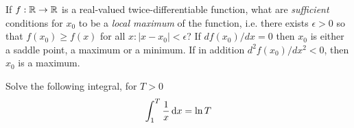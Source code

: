 \documentclass[a4paper]{article}
\def\solution {1}
\begin{document}
\begin{exercise}
  If $f : {\mathbb{R}} \to {\mathbb{R}}$ is a real-valued twice-differentiable function, what are \emph{sufficient} conditions for $x_0$ to be a \emph{local maximum} of the function, i.e. there exists $\epsilon > 0$ so that $f(x_0) \geq f(x)$ for all $x : |x - x_0| < \epsilon$?
  \ifdefined\solution
  If $d f(x_0) /dx  = 0$ then
  $x_0$ is either a saddle point, a maximum or a minimum. If in addition $d^2 f(x_0) /dx^2 < 0$, then $x_0$ is a maximum.
  \fi
\end{exercise}

\begin{exercise}
  Solve the following integral, for $T > 0$
  \[
  \int_{1}^T \frac{1}{x} \dd x =
  \ifdefined\solution
  \ln T
  \else 
  \ldots
  \fi
  \]
\end{exercise}
\end{document}
